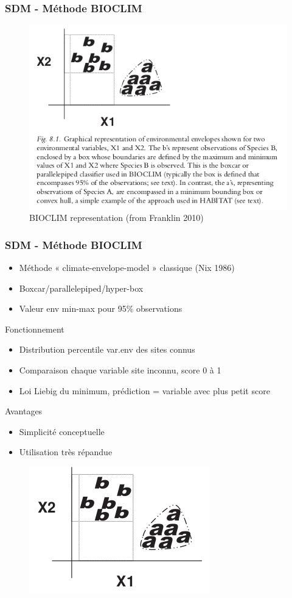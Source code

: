 \documentclass[10pt]{beamer}
\begin{document}
\begin{frame}
  \frametitle{SDM - Méthode BIOCLIM}
  \begin{figure}
    \centering
    \includegraphics[scale=0.4]{bioclim-with-caption.png}
    \caption{BIOCLIM representation (from Franklin 2010)}
  \end{figure}
\end{frame}

\begin{frame}
  \frametitle{SDM - Méthode BIOCLIM}
  \begin{itemize}
    \item Méthode « climate-envelope-model » classique (Nix 1986)
    \item Boxcar/parallelepiped/hyper-box
    \item Valeur env min-max pour 95\% observations
  \end{itemize}
  Fonctionnement
  \begin{itemize}
    \item Distribution percentile var.env des sites connus
    \item Comparaison chaque variable site inconnu, score 0 à 1
    \item Loi Liebig du minimum, prédiction = variable avec plus petit score
  \end{itemize}
  Avantages
  \begin{itemize}
    \item Simplicité conceptuelle
    \item Utilisation très répandue
  \end{itemize}
  \begin{figure}
    \centering
    \includegraphics[scale=0.4]{bioclim-fig-only.png}
  \end{figure}
\end{frame}
\end{document}

